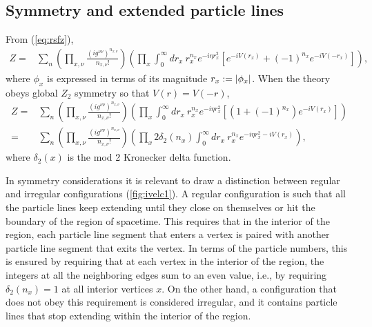 \documentclass[12pt]{article}
\theoremstyle{definition}
\begin{document}
\subsection*{Symmetry and extended particle lines}\label{sec:sepl}

From (\ref{eq:rsfz}),
\begin{align}
Z%
=& \sum_{n}(\prod_{x,\nu} \frac{( i g^{\nu\nu})^{n_{x,\nu}}}{n_{x,\nu}!}) (\prod_{x} \int_0^\infty d r_x ~ r_x^{n_x}e^{-i\eta r_x^2}[e^{-iV(r_x)}+(-1)^{n_x}e^{-iV(-r_x)}] ), \label{eq:grsf}
\end{align}
where $\phi_x$ is expressed in terms of its magnitude $r_x:=\abs{\phi_x}$. When the theory obeys global $Z_2$ symmetry so that $V(r)=V(-r)$,
\begin{align}
Z =& \sum_{n}(\prod_{x,\nu} \frac{( i g^{\nu\nu})^{n_{x,\nu}}}{n_{x,\nu}!}) (\prod_{x} \int_0^\infty d r_x ~ r_x^{n_x}e^{-i\eta r_x^2}[(1+(-1)^{n_x})e^{-iV(r_x)}] )
\label{eq:rsfz2}
\\=& \sum_{n}(\prod_{x,\nu} \frac{( i g^{\nu\nu})^{n_{x,\nu}}}{n_{x,\nu}!}) (\prod_{x} 2 \delta_2(n_x)\int_0^\infty d r_x ~ r_x^{n_x}e^{-i\eta r_x^2-iV(r_x)}),
\end{align}
where $\delta_2(x)$ is the mod 2 Kronecker delta function. 

In symmetry considerations it is relevant to draw a distinction between regular and irregular configurations (\cref{fig:ivelc1}). A regular configuration is such that all the particle lines keep extending until they close on themselves or hit the boundary of the region of spacetime. This requires that in the interior of the region, each particle line segment that enters a vertex is paired with another particle line segment that exits the vertex. In terms of the particle numbers, this is ensured by requiring that at each vertex in the interior of the region, the integers at all the neighboring edges sum to an even value, i.e., by requiring $\delta_2(n_x)=1$ at all interior vertices $x$. On the other hand, a configuration that does not obey this requirement is considered irregular, and it contains particle lines that stop extending within the interior of the region.
\end{document}
